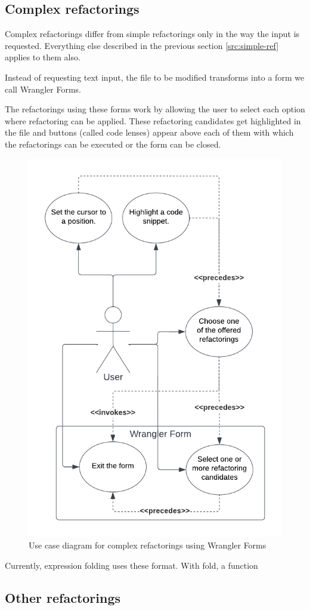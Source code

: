 \subsection{Complex refactorings}

Complex refactorings differ from simple refactorings only in the way the input is requested. Everything else described in the previous section \ref{src:simple-ref} applies to them also.

Instead of requesting text input, the file to be modified transforms into a form we call Wrangler Forms.

The refactorings using these forms work by allowing the user to select each option where refactoring can be applied. These refactoring candidates get highlighted in the file and buttons (called code lenses) appear above each of them with which the refactorings can be executed or the form can be closed.

\begin{figure}[H]
	\centering
	\includegraphics[width=1\textwidth]{images/use_case_2.png}
	\caption{Use case diagram for complex refactorings using Wrangler Forms}
	\label{fig:usecase2}
\end{figure}


Currently, expression folding uses these format. With fold, a function



\subsection{Other refactorings}

